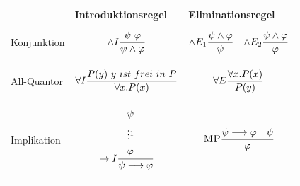 \documentclass{Zusammenfassung}
\newcommand{\typeRule}[3]{ \textrm{\textsc{#1}}\frac{#2}{#3}}
\begin{document}
\begin{table}[H]
    \centering
    \begin{tabularx}{\textwidth}{lXX}
        & \centerline{\textbf{Introduktionsregel}} &\centerline{\textbf{Eliminationsregel}}\\
        Konjunktion &\begin{equation*}\typeRule{$\wedge{}I$}{\psi\ \varphi}{\psi\wedge \varphi}\end{equation*}&\begin{equation*}\typeRule{$\wedge{}E_1$}{\psi\wedge \varphi}{\psi}\quad\typeRule{$\wedge{}E_2$}{\psi\wedge \varphi}{\varphi}\end{equation*}\\
        All-Quantor &\begin{equation*}\typeRule{$\forall{}I$}{P(y)\ y\ ist\ frei\ in\ P}{\forall{}x.P(x)}\end{equation*}&\begin{equation*}\typeRule{$\forall{}E$}{\forall{}x.P(x)}{P(y)}\end{equation*}\\
        Implikation&\begin{equation*}\typeRule{$\rightarrow{}I$}{\begin{aligned}&\psi&\\&\vdots\footnotemark{}&\\&\varphi&\end{aligned}}{\psi\longrightarrow\varphi}\end{equation*}&\begin{equation*}\typeRule{MP}{\psi\longrightarrow\varphi\quad\psi}{\varphi}\end{equation*}\\
    \end{tabularx}\label{tab:table4}
\end{table}
\end{document}
